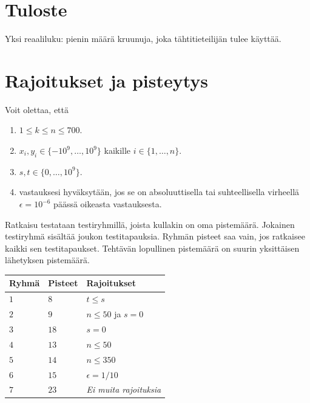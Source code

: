 \section*{Tuloste}

Yksi reaaliluku: pienin määrä kruunuja, joka tähtitieteilijän tulee käyttää.

\section*{Rajoitukset ja pisteytys} %

Voit olettaa, että
\begin{enumerate}
\item $1\leq k\leq n\leq 700$. %
\item $x_i, y_i\in \{-10^9,\ldots, 10^9\}$ kaikille $i\in\{1,\ldots,n\}$. %
\item $s,t\in \{0,\ldots, 10^9\}$. %
\item vastauksesi hyväksytään, jos se on absoluuttisella tai suhteellisella virheellä $\epsilon = 10^{-6}$ päässä oikeasta vastauksesta.
\end{enumerate}


Ratkaisu testataan testiryhmillä, joista kullakin on oma pistemäärä.
Jokainen testiryhmä sisältää joukon testitapauksia.
Ryhmän pisteet saa vain, jos ratkaisee kaikki sen testitapaukset.
Tehtävän lopullinen pistemäärä on suurin yksittäisen lähetyksen pistemäärä.

\medskip
\noindent
\begin{tabular}{lll}
  Ryhmä & Pisteet & Rajoitukset\\\hline
  $1$ & $8$ &  $t\leq s$\\
  $2$ & $9$ & $n\le 50$ ja $s=0$\\
  $3$ & $18$ & $s=0$\\
  $4$ & $13$ & $n\leq 50$\\
  $5$ & $14$ & $n\leq 350$\\
  $6$ & $15$ & $\epsilon = 1/10$\\
  $7$ & $23$ & \emph{Ei muita rajoituksia}\\
\end{tabular}
